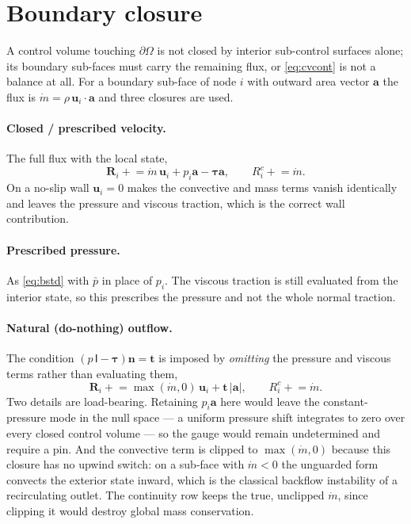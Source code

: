 \documentclass[11pt,a4paper]{article}
\newcommand{\bu}{\mathbf{u}}
\newcommand{\bn}{\mathbf{n}}
\newcommand{\ba}{\mathbf{a}}
\newcommand{\bR}{\mathbf{R}}
\newcommand{\bt}{\mathbf{t}}
\newcommand{\bI}{\mathsf{I}}
\newcommand{\bttau}{\boldsymbol{\tau}}
\newcommand{\mdot}{\dot m}
\begin{document}
\section{Boundary closure}
\label{sec:boundary}

A control volume touching $\partial\Omega$ is not closed by interior sub-control surfaces
alone; its boundary sub-faces must carry the remaining flux, or \eqref{eq:cvcont} is not a
balance at all. For a boundary sub-face of node $i$ with outward area vector $\ba$ the flux is
$\mdot = \rho\, \bu_i \cdot \ba$ and three closures are used.

\paragraph{Closed / prescribed velocity.} The full flux with the local state,
\begin{equation}
  \bR_i \mathrel{+}= \mdot\, \bu_i + p_i \ba - \bttau \ba ,
  \qquad
  R^c_i \mathrel{+}= \mdot .
  \label{eq:bstd}
\end{equation}
On a no-slip wall $\bu_i = 0$ makes the convective and mass terms vanish identically and
leaves the pressure and viscous traction, which is the correct wall contribution.

\paragraph{Prescribed pressure.} As \eqref{eq:bstd} with $\bar p$ in place of $p_i$. The
viscous traction is still evaluated from the interior state, so this prescribes the pressure
and not the whole normal traction.

\paragraph{Natural (do-nothing) outflow.} The condition $(p\,\bI - \bttau)\bn = \bt$ is
imposed by \emph{omitting} the pressure and viscous terms rather than evaluating them,
\begin{equation}
  \bR_i \mathrel{+}= \max(\mdot, 0)\, \bu_i + \bt \, |\ba| ,
  \qquad
  R^c_i \mathrel{+}= \mdot .
  \label{eq:bnat}
\end{equation}
Two details are load-bearing. Retaining $p_i \ba$ here would leave the constant-pressure mode
in the null space --- a uniform pressure shift integrates to zero over every closed control
volume --- so the gauge would remain undetermined and require a pin. And the convective term
is clipped to $\max(\mdot,0)$ because this closure has no upwind switch: on a sub-face with
$\mdot < 0$ the unguarded form convects the exterior state inward, which is the classical
backflow instability of a recirculating outlet. The continuity row keeps the true, unclipped
$\mdot$, since clipping it would destroy global mass conservation.
\end{document}
